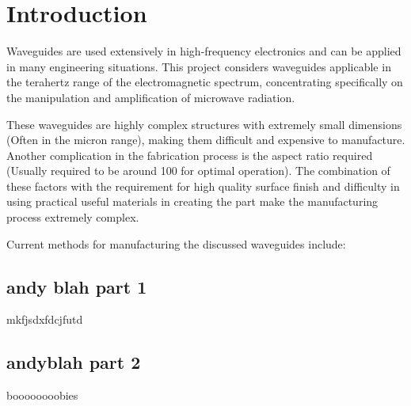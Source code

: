 \section{Introduction}
Waveguides are used extensively in high-frequency electronics and can be applied in many engineering situations. This project considers waveguides applicable in the terahertz range of the electromagnetic spectrum, concentrating specifically on the manipulation and amplification of microwave radiation.

These waveguides are highly complex structures with extremely small dimensions (Often in the micron range), making them difficult and expensive to manufacture. Another complication in the fabrication process is the aspect ratio required (Usually required to be around 100 for optimal operation). The combination of these factors with the requirement for high quality surface finish and difficulty in using practical useful materials in creating the part make the manufacturing process extremely complex.

Current methods for manufacturing the discussed waveguides include:

\subsection{andy blah part 1}
mkfjsdxfdcjfutd

\subsection{andyblah part 2}
boooooooobies